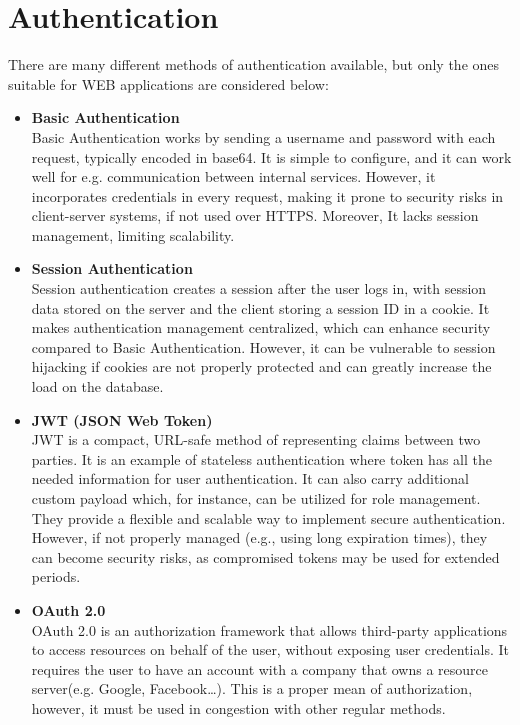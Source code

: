 \section{Authentication}
There are many different methods of authentication available, but only the ones suitable for
WEB applications are considered below:
\begin{itemize}
    \item \textbf{Basic Authentication} \\
    Basic Authentication works by sending a username and password with each request,
    typically encoded in base64.\cite{basic_auth} It is simple to configure, and it can work well for
    e.g. communication between internal services. However, it incorporates credentials in every request,
    making it prone to security risks in client-server systems, if not used over HTTPS.
    Moreover, It lacks session management, limiting scalability.

    \item \textbf{Session Authentication} \\
    Session authentication creates a session after the user logs in, with session
    data stored on the server and the client storing a session ID in a cookie.
    It makes authentication management centralized, which can enhance security compared to Basic Authentication.
    However, it can be vulnerable to session hijacking if cookies are not properly protected
    and can greatly increase the load on the database.\cite{session_auth}

    \item \textbf{JWT (JSON Web Token)} \\
    JWT is a compact, URL-safe method of representing claims between two parties.\cite{jwt}
    It is an example of stateless authentication where token has all the needed information for user authentication.
    It can also carry additional custom payload which, for instance, can be utilized for role management.
    They provide a flexible and scalable way to implement secure authentication.
    However, if not properly managed (e.g., using long expiration times), they can become security risks,
    as compromised tokens may be used for extended periods.

    \item \textbf{OAuth 2.0} \\
    OAuth 2.0 is an authorization framework that allows third-party applications to access resources
    on behalf of the user, without exposing user credentials.\cite{oauth2} It requires the user to have an account
    with a company that owns a resource server(e.g. Google, Facebook\ldots). This is a proper mean of
    authorization, however, it must be used in congestion with other regular methods.
\end{itemize}

